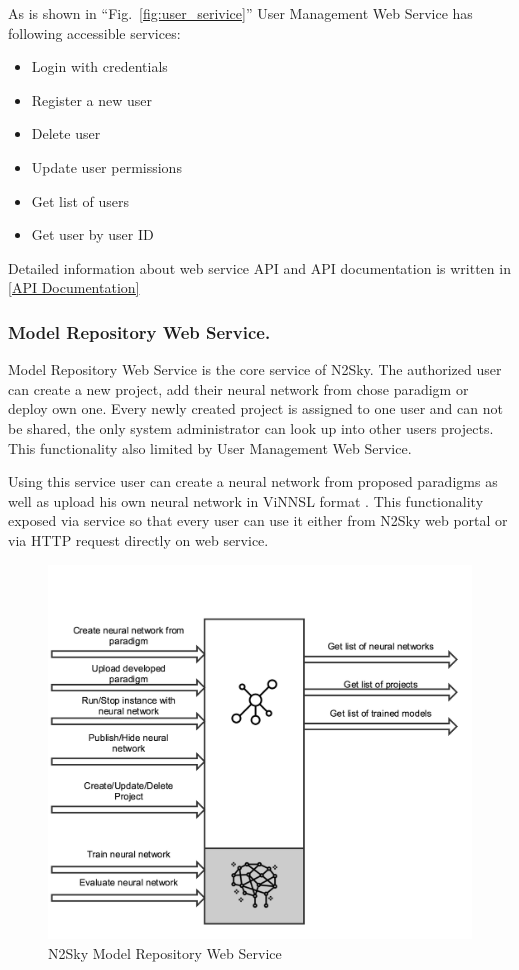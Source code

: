 As is shown in ``Fig.~\ref{fig:user_serivice}'' User Management Web Service has following accessible services:

\begin{itemize}
\item Login with credentials
\item Register a new user 
\item Delete user
\item Update user permissions
\item Get list of users
\item Get user by user ID
\end{itemize}
 
 Detailed information about web service API and API documentation is written in \autoref{API Documentation}

\subsubsection{Model Repository Web Service.}\label{Model Repository Web Service}  Model Repository Web Service is the core service of N2Sky. The authorized user can create a new project, add their neural network from chose paradigm or deploy own one. Every newly created project is assigned to one user and can not be shared, the only system administrator can look up into other users projects. This functionality also limited by User Management Web Service. 

Using this service user can create a neural network from proposed paradigms as well as upload his own neural network in ViNNSL format \cite{Beran2008}. This functionality exposed via service so that every user can use it either from N2Sky web portal or via HTTP request directly on web service.

\begin{figure}[H]
\begin{center}
  \includegraphics[width=\linewidth]{components/3/components/model_serivce.png}
  \caption{N2Sky Model Repository Web Service}
  \label{fig:model_serivce}
\end{center}
\end{figure}

